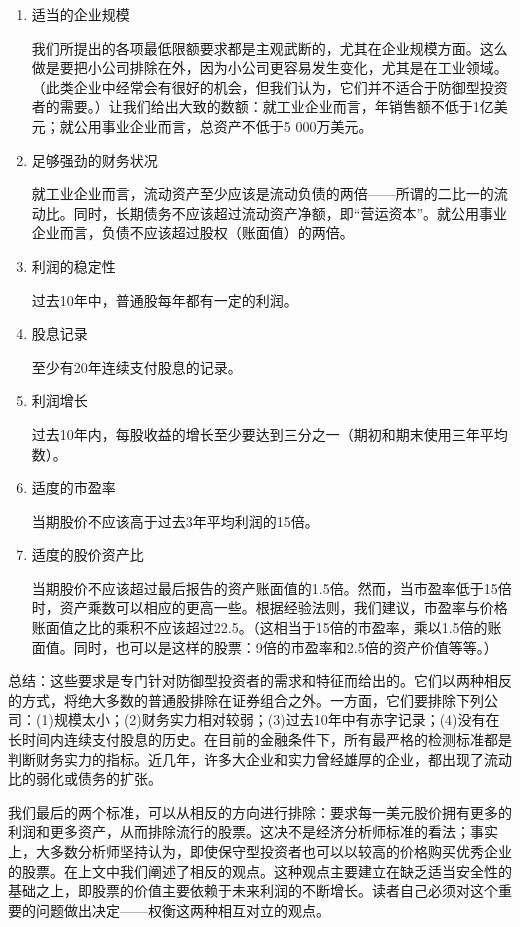 \documentclass[12pt,oneside]{book}
\begin{document}
\begin{enumerate}
\item 适当的企业规模

我们所提出的各项最低限额要求都是主观武断的，尤其在企业规模方面。这么做是要把小公司排除在外，因为小公司更容易发生变化，尤其是在工业领域。（此类企业中经常会有很好的机会，但我们认为，它们并不适合于防御型投资者的需要。）让我们给出大致的数额：就工业企业而言，年销售额不低于1亿美元；就公用事业企业而言，总资产不低于5 000万美元。
\item 足够强劲的财务状况

就工业企业而言，流动资产至少应该是流动负债的两倍——所谓的二比一的流动比。同时，长期债务不应该超过流动资产净额，即“营运资本”。就公用事业企业而言，负债不应该超过股权（账面值）的两倍。
\item 利润的稳定性

过去10年中，普通股每年都有一定的利润。


\item 股息记录

至少有20年连续支付股息的记录。

\item 利润增长

过去10年内，每股收益的增长至少要达到三分之一（期初和期末使用三年平均数）。
\item 适度的市盈率

当期股价不应该高于过去3年平均利润的15倍。
\item 适度的股价资产比

当期股价不应该超过最后报告的资产账面值的1.5倍。然而，当市盈率低于15倍时，资产乘数可以相应的更高一些。根据经验法则，我们建议，市盈率与价格账面值之比的乘积不应该超过22.5。（这相当于15倍的市盈率，乘以1.5倍的账面值。同时，也可以是这样的股票：9倍的市盈率和2.5倍的资产价值等等。）


\end{enumerate}



总结：这些要求是专门针对防御型投资者的需求和特征而给出的。它们以两种相反的方式，将绝大多数的普通股排除在证券组合之外。一方面，它们要排除下列公司：(1)规模太小；(2)财务实力相对较弱；(3)过去10年中有赤字记录；(4)没有在长时间内连续支付股息的历史。在目前的金融条件下，所有最严格的检测标准都是判断财务实力的指标。近几年，许多大企业和实力曾经雄厚的企业，都出现了流动比的弱化或债务的扩张。


我们最后的两个标准，可以从相反的方向进行排除：要求每一美元股价拥有更多的利润和更多资产，从而排除流行的股票。这决不是经济分析师标准的看法；事实上，大多数分析师坚持认为，即使保守型投资者也可以以较高的价格购买优秀企业的股票。在上文中我们阐述了相反的观点。这种观点主要建立在缺乏适当安全性的基础之上，即股票的价值主要依赖于未来利润的不断增长。读者自己必须对这个重要的问题做出决定——权衡这两种相互对立的观点。
\end{document}
